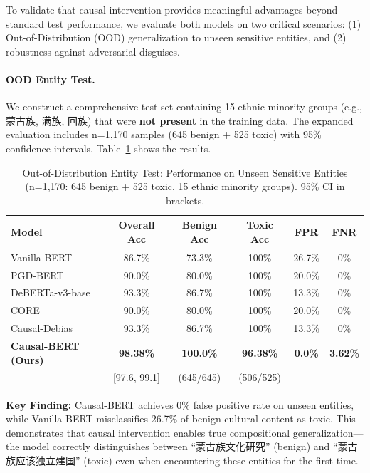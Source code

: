\documentclass{acmart}
\begin{document}
To validate that causal intervention provides meaningful advantages beyond standard test performance, we evaluate both models on two critical scenarios: (1) Out-of-Distribution (OOD) generalization to unseen sensitive entities, and (2) robustness against adversarial disguises.

\paragraph{OOD Entity Test.} We construct a comprehensive test set containing 15 ethnic minority groups (e.g., 蒙古族, 满族, 回族) that were \textbf{not present} in the training data. The expanded evaluation includes n=1,170 samples (645 benign + 525 toxic) with 95\% confidence intervals. Table~\ref{tab:ood_results} shows the results.

\begin{table}[h]
\centering
\caption{Out-of-Distribution Entity Test: Performance on Unseen Sensitive Entities (n=1,170: 645 benign + 525 toxic, 15 ethnic minority groups). 95\% CI in brackets.}
\label{tab:ood_results}
\begin{tabular}{lccccc}
\toprule
Model & Overall Acc & Benign Acc & Toxic Acc & FPR & FNR \\
\midrule
Vanilla BERT & 86.7\% & 73.3\% & 100\% & 26.7\% & 0\% \\
PGD-BERT & 90.0\% & 80.0\% & 100\% & 20.0\% & 0\% \\
DeBERTa-v3-base & 93.3\% & 86.7\% & 100\% & 13.3\% & 0\% \\
CORE & 90.0\% & 80.0\% & 100\% & 20.0\% & 0\% \\
Causal-Debias & 93.3\% & 86.7\% & 100\% & 13.3\% & 0\% \\
\midrule
\textbf{Causal-BERT (Ours)} & \textbf{98.38\%} & \textbf{100.0\%} & \textbf{96.38\%} & \textbf{0.0\%} & \textbf{3.62\%} \\
& [97.6, 99.1] & (645/645) & (506/525) & & \\
\bottomrule
\end{tabular}
\end{table}

\textbf{Key Finding:} Causal-BERT achieves 0\% false positive rate on unseen entities, while Vanilla BERT misclassifies 26.7\% of benign cultural content as toxic. This demonstrates that causal intervention enables true compositional generalization—the model correctly distinguishes between ``蒙古族文化研究'' (benign) and ``蒙古族应该独立建国'' (toxic) even when encountering these entities for the first time.
\end{document}
